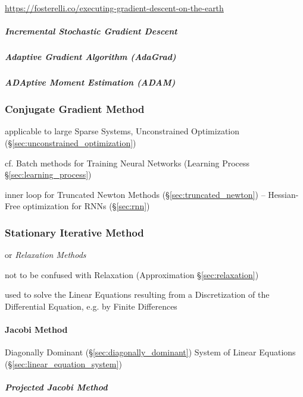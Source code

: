 {\url{https://fosterelli.co/executing-gradient-descent-on-the-earth}



\subparagraph{Incremental Stochastic Gradient Descent}
\label{sec:incremental_sgd}\hfill

\subparagraph{Adaptive Gradient Algorithm (AdaGrad)}\label{sec:adagrad}\hfill

\subparagraph{ADAptive Moment Estimation (ADAM)}\label{sec:adam}\hfill



\subsubsection{Conjugate Gradient Method}\label{sec:conjugate_gradient_method}

applicable to large Sparse Systems, Unconstrained Optimization
(\S\ref{sec:unconstrained_optimization})

\fist cf. Batch methods for Training Neural Networks (Learning Process
\S\ref{sec:learning_process})

inner loop for Truncated Newton Methods (\S\ref{sec:truncated_newton}) --
Hessian-Free optimization for RNNs (\S\ref{sec:rnn})



\subsubsection{Stationary Iterative Method}
\label{sec:stationary_iterative}

or \emph{Relaxation Methods}

\fist not to be confused with Relaxation (Approximation \S\ref{sec:relaxation})

used to solve the Linear Equations resulting from a Discretization of the
Differential Equation, e.g. by Finite Differences



\paragraph{Jacobi Method}\label{sec:jacobi_method}\hfill

Diagonally Dominant (\S\ref{sec:diagonally_dominant}) System of Linear
Equations (\S\ref{sec:linear_equation_system})



\subparagraph{Projected Jacobi Method}
\label{sec:projected_jacobi_method}



}
